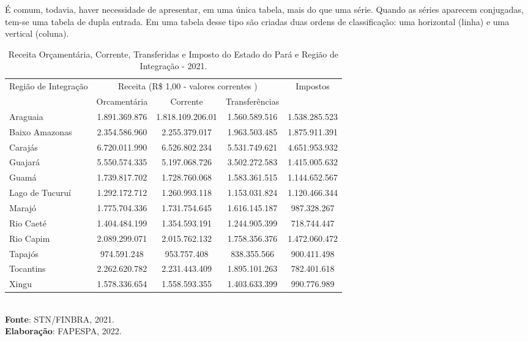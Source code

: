 \inic É comum, todavia, haver necessidade de apresentar, em uma única tabela, mais do que uma série. Quando as séries aparecem conjugadas, tem-se uma tabela de dupla entrada. Em uma tabela desse tipo são criadas duas ordens de classificação: uma horizontal (linha) e uma vertical (coluna).



\begin{table}[!htb]
\centering
    {
    \caption{Receita Orçamentária, Corrente, Transferidas e Imposto do Estado do Pará e Região de Integração - 2021.}
    \label{obitos2}
    \vspace{0.1cm}
\begin{tabular}{l|c|c|c|c}
\hline\hline 
\multirow{2}{*}{Região de Integração} & \multicolumn{3}{c|}{Receita (R\$ 1,00 - valores correntes )}                                                     & \multirow{2}{*}{Impostos} \\ \cline{2-4}
                           & \multicolumn{1}{c|}{Orcamentária} & \multicolumn{1}{c|}{Corrente} & Transferências &  \\ 
\hline\hline                           
Araguaia           &  1.891.369.876 & 1.818.109.206.01 & 1.560.589.516 & 1.538.285.523 \\
Baixo Amazonas     &  2.354.586.960 & 2.255.379.017    & 1.963.503.485 & 1.875.911.391 \\
Carajás            &  6.720.011.990 & 6.526.802.234    & 5.531.749.621 & 4.651.953.932 \\
Guajará            &  5.550.574.335 & 5.197.068.726    & 3.502.272.583 & 1.415.005.632 \\
Guamá              &  1.739.817.702 & 1.728.760.068    & 1.583.361.515 & 1.144.652.567 \\
Lago de Tucuruí    &  1.292.172.712 & 1.260.993.118    & 1.153.031.824 & 1.120.466.344 \\
Marajó             &  1.775.704.336 & 1.731.754.645    & 1.616.145.187 & 987.328.267   \\
Rio Caeté          &  1.404.484.199 & 1.354.593.191    & 1.244.905.399 &  718.744.447  \\
Rio Capim          &  2.089.299.071 & 2.015.762.132    & 1.758.356.376 &  1.472.060.472 \\
Tapajós            &  974.591.248   & 953.757.408      & 838.355.566   &  900.411.498  \\
Tocantins          &  2.262.620.782 & 2.231.443.409    & 1.895.101.263 &  782.401.618 \\
Xingu              &  1.578.336.654 & 1.558.593.355    & 1.403.633.399 &  990.776.989 \\                   
\hline\hline
\end{tabular}}
\\ 
\hspace{-8.4cm}
\textbf{Fonte}: STN/FINBRA, 2021. \\
\hspace{-8.2cm}
\textbf{Elaboração}: FAPESPA, 2022.
\end{table}


